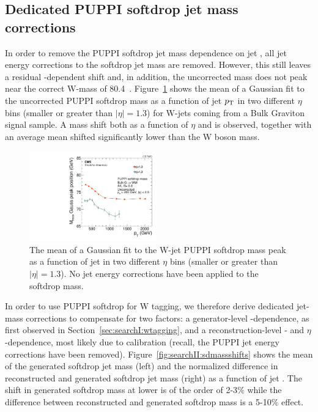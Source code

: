 \subsection{Dedicated PUPPI softdrop jet mass corrections}
\label{sec:searchII:masscorr}
In order to remove the PUPPI softdrop jet mass dependence on jet \PT, all jet energy corrections to the softdrop jet mass are removed. However, this still leaves a residual \PT-dependent shift and, in addition, the uncorrected mass does not peak near the correct W-mass of 80.4~\GeV. Figure~\ref{fig:searchII:UncorrSD} shows the mean of a Gaussian fit to the uncorrected PUPPI softdrop mass as a function of jet $p_{\mathrm{T}}$ in two different $\eta$ bins (smaller or greater than $|\eta|=1.3$) for W-jets coming from a Bulk Graviton signal sample. A mass shift both as a function of $\eta$ and \PT is observed, together with an average mean shifted significantly lower than the W boson mass.
\begin{figure}[h!]
\centering
\includegraphics[width=0.49\textwidth]{figures/analysis/search2/AN-16-235/plots/RecoPuppiSoftdropMass_vspt.pdf}
\caption{The mean of a Gaussian fit to the W-jet PUPPI softdrop mass peak as a function of jet \PT in two different $\eta$ bins (smaller or greater than $|\eta|=1.3$). No jet energy corrections have been applied to the softdrop mass.}
\label{fig:searchII:UncorrSD}
\end{figure}
In order to use PUPPI softdrop for W tagging, we therefore derive dedicated jet-mass corrections to compensate for two factors: a generator-level \PT-dependence, as first observed in Section~\ref{sec:searchI:wtagging}, and a reconstruction-level \PT- and $\eta$-dependence, most likely due to calibration (recall, the PUPPI jet energy corrections have been removed). Figure~\ref{fig:searchII:sdmassshifts} shows the mean of the generated softdrop jet mass (left) and the normalized difference in reconstructed and generated softdrop jet mass (right) as a function of jet \PT. The shift in generated softdrop mass at lower \PT is of the order of 2-3$\%$ while the difference between reconstructed and generated softdrop mass is a 5-10$\%$ effect.
